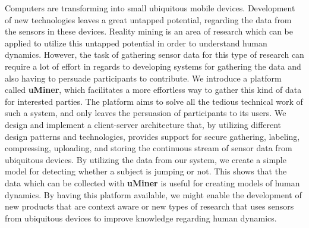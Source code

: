 
Computers are transforming into small ubiquitous mobile devices. Development of new technologies leaves a great untapped potential, regarding the data from the sensors in these devices. 
Reality mining is an area of research which can be applied to utilize this untapped potential in order to understand human dynamics. However, the task of gathering sensor data for this type of research can require a lot of effort in regards to developing systems for gathering the data and also having to persuade participants to contribute.
We introduce a platform called \textbf{uMiner}, which facilitates a more effortless way to gather this kind of data for interested parties. The platform aims to solve all the tedious technical work of such a system, and only leaves the persuasion of participants to its users.
We design and implement a client-server architecture that, by utilizing different design patterns and technologies, provides support for secure gathering, labeling, compressing, uploading, and storing the continuous stream of sensor data from ubiquitous devices. 
By utilizing the data from our system, we create a simple model for detecting whether a subject is jumping or not. This shows that the data which can be collected with \textbf{uMiner} is useful for creating models of human dynamics.  
By having this platform available, we might enable the development of new products that are context aware or new types of research that uses sensors from ubiquitous devices to improve knowledge regarding human dynamics.